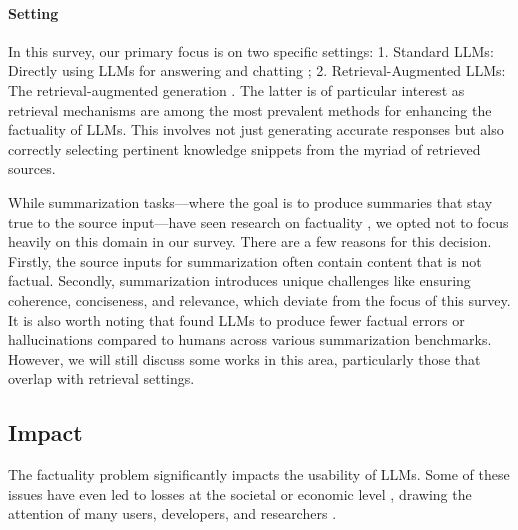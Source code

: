 \paragraph{Setting}
In this survey, our primary focus is on two specific settings:
1. Standard LLMs: Directly using LLMs for answering and chatting \citep{GPT4,chatgpt};
2. Retrieval-Augmented LLMs: The retrieval-augmented generation \citep{BingChat,LlamaIndex}.
The latter is of particular interest as retrieval mechanisms are among the most prevalent methods for enhancing the factuality of LLMs. This involves not just generating accurate responses but also correctly selecting pertinent knowledge snippets from the myriad of retrieved sources.

While summarization tasks—where the goal is to produce summaries that stay true to the source input—have seen research on factuality \citep{maynez-etal-2020-faithfulness,tam-etal-2023-evaluating,tang-etal-2022-confit}, we opted not to focus heavily on this domain in our survey. There are a few reasons for this decision. Firstly, the source inputs for summarization often contain content that is not factual. Secondly, summarization introduces unique challenges like ensuring coherence, conciseness, and relevance, which deviate from the focus of this survey.
It is also worth noting that \citet{pu2023summarization} found LLMs to produce fewer factual errors or hallucinations compared to humans across various summarization benchmarks. However, we will still discuss some works in this area, particularly those that overlap with retrieval settings.


\subsection{Impact}
\label{sec:impact}
The factuality problem significantly impacts the usability of LLMs. Some of these issues have even led to losses at the societal or economic level \citep{Pranshu2023,news_mayor}, drawing the attention of many users, developers, and researchers \citep{Hallucination_Survey}.

